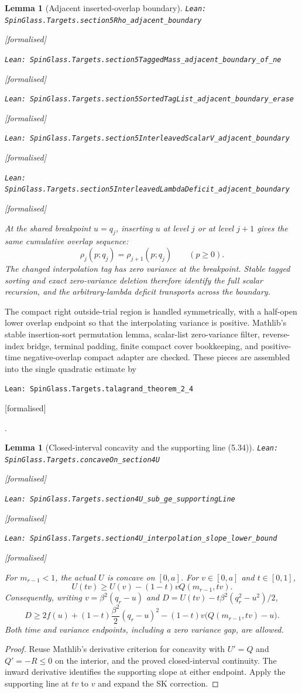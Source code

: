 \documentclass[11pt]{article}
\providecommand{\lean}[1]{\leavevmode\par\nopagebreak
  {\noindent\normalfont\footnotesize\raggedright\texttt{Lean: #1}\par}\nopagebreak}
\providecommand{\leanok}{\par\nopagebreak
  {\noindent\normalfont\footnotesize\textcolor{green!50!black}{[formalised]}\par}\nopagebreak}
\newtheorem{lemma}[theorem]{Lemma}
\begin{document}
\begin{lemma}[Adjacent inserted-overlap boundary]
\lean{SpinGlass.Targets.section5Rho\_adjacent\_boundary}\leanok
\lean{SpinGlass.Targets.section5TaggedMass\_adjacent\_boundary\_of\_ne}\leanok
\lean{SpinGlass.Targets.section5SortedTagList\_adjacent\_boundary\_erase}\leanok
\lean{SpinGlass.Targets.section5InterleavedScalarV\_adjacent\_boundary}\leanok
\lean{SpinGlass.Targets.section5InterleavedLambdaDeficit\_adjacent\_boundary}\leanok
At the shared breakpoint $u=q_j$, inserting $u$ at level $j$ or at level
$j+1$ gives the same cumulative overlap sequence:
\[
  \rho_{j}(p;q_j)=\rho_{j+1}(p;q_j)\qquad(p\ge0).
\]
The changed interpolation tag has zero variance at the breakpoint. Stable
tagged sorting and exact zero-variance deletion therefore identify the full
scalar recursion, and the arbitrary-lambda deficit transports across the
boundary.
\end{lemma}

The compact right outside-trial region is handled symmetrically, with a
half-open lower overlap endpoint so that the interpolating variance is
positive. Mathlib's stable insertion-sort permutation lemma, scalar-list
zero-variance filter, reverse-index bridge, terminal padding, finite compact
cover bookkeeping, and positive-time negative-overlap compact adapter are
checked. These pieces are assembled into the single quadratic estimate by
\lean{SpinGlass.Targets.talagrand\_theorem\_2\_4}\leanok.

\begin{lemma}[Closed-interval concavity and the supporting line (5.34)]
\lean{SpinGlass.Targets.concaveOn\_section4U}\leanok
\lean{SpinGlass.Targets.section4U\_sub\_ge\_supportingLine}\leanok
\lean{SpinGlass.Targets.section4U\_interpolation\_slope\_lower\_bound}\leanok
For $m_{r-1}<1$, the actual $U$ is concave on $[0,a]$. For $v\in[0,a]$
and $t\in[0,1]$,
\[
 U(tv)\ge U(v)-(1-t)vQ(m_{r-1},tv).
\]
Consequently, writing $v=\beta^2(q_r-u)$ and
$D=U(tv)-t\beta^2(q_r^2-u^2)/2$,
\[
 D\ge2f(u)+(1-t)\frac{\beta^2}2(q_r-u)^2
       -(1-t)v\bigl(Q(m_{r-1},tv)-u\bigr).
\]
Both time and variance endpoints, including a zero variance gap, are allowed.
\end{lemma}
\begin{proof}
Reuse Mathlib's derivative criterion for concavity with $U'=Q$ and
$Q'=-R\le0$ on the interior, and the proved closed-interval continuity.
The inward derivative identifies the supporting slope at either endpoint.
Apply the supporting line at $tv$ to $v$ and expand the SK correction.
\end{proof}
\end{document}

